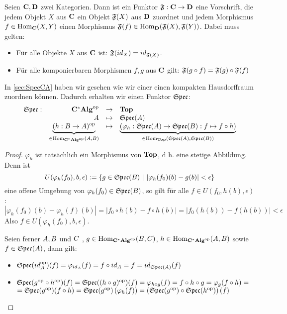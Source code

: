 \begin{defn}[Funktor]
Seien $\mathbf{C}, \mathbf{D}$ zwei Kategorien. Dann ist ein Funktor $\mathfrak{F}: \mathbf{C} \to \mathbf{D}$ eine Vorschrift, die jedem Objekt $X$ aus $\mathbf{C}$ ein Objekt $\mathfrak{F}(X)$ aus $\mathbf{D}$ zuordnet und jedem Morphismus $f \in \mathrm{Hom}_{\mathbf{C}}(X,Y)$ einen Morphismus $\mathfrak{F}(f) \in \mathrm{Hom}_{\mathbf{D}}(\mathfrak{F}(X), \mathfrak{F}(Y))$. Dabei muss gelten:
\begin{itemize}
	\item Für alle Objekte $X$ aus $\mathbf{C}$ ist: $\mathfrak{F}(id_X) = id_{\mathfrak{F}(X)}$.
	\item Für alle komponierbaren Morphismen $f, g$ aus $\mathbf{C}$ gilt: $\mathfrak{F}(g\circ f) = \mathfrak{F}(g)\circ \mathfrak{F}(f)$
\end{itemize}
\end{defn}

\begin{bsp}\label{bsp:FunktorSpec}
In \cref{sec:SpecCA} haben wir gesehen wie wir einer \CAlg{} einen kompakten Hausdorffraum zuordnen können. Dadurch erhalten wir einen Funktor $\mathfrak{Spec}$:
\[ \begin{array}{@{}rrcl@{}}
	\SpecC: 	&\KatCAlg^\op		&\to 		&\KatTop													\\
				&\A					&\mapsto 	&\SpecC(\A)													\\				
				&\underbrace{(h:\B \to \A)^\op}_{\in \Hom_{\KatCAlg^\op}(\A,\B)} 	&\mapsto	
				&\underbrace{(\varphi_h: \SpecC(\A) \to \SpecC(\B): f \mapsto f \circ h)}_{\in \Hom_{\KatTop}(\SpecC(\A),\SpecC(\B))}
\end{array} \]
\end{bsp}

\begin{proof}$\varphi_h$ ist tatsächlich ein Morphismus von $\mathbf{Top}$, d h. eine stetige Abbildung. Denn ist 
	\[U(\varphi_h(f_0), b, \epsilon) := \{g \in \mathfrak{Spec}(B) ~|~ |\varphi_h(f_0)(b)-g(b)| < \epsilon\}\]
eine offene Umgebung von $\varphi_h(f_0) \in \mathfrak{Spec}(B)$, so gilt für alle $f \in U(f_0,h(b),\epsilon)$:
	\[\left|\varphi_h(f_0)(b)-\varphi_h(f)(b)\right| = \left|f_0\circ h(b) - f\circ h(b)\right| = \left|f_0(h(b))-f(h(b))\right| < \epsilon\]
Also $f \in U(\varphi_h(f_0), b, \epsilon)$.

Seien ferner $A, B$ und $C$ \CAlgn{}, $g \in \mathrm{Hom}_{\mathbf{C^*Alg}^{\mathrm{op}}}(B,C)$, $h \in \mathrm{Hom}_{\mathbf{C^*Alg}^{\mathrm{op}}}(A,B)$ sowie $f \in \mathfrak{Spec}(A)$, dann gilt:
\begin{itemize}
	\item $\mathfrak{Spec}(id_A^{\mathrm{op}})(f) = \varphi_{id_A}(f) = f \circ id_A = f =  id_{\mathfrak{Spec}(A)}(f)$
	\item $\mathfrak{Spec}(g^{\mathrm{op}} \circ h^{\mathrm{op}})(f) = \mathfrak{Spec}((h \circ g)^{\mathrm{op}})(f) = \varphi_{h \circ g}(f) = f \circ h \circ g = \varphi_g(f \circ h) =$ \newline $ = \mathfrak{Spec}(g^{\mathrm{op}})(f \circ h) = \mathfrak{Spec}(g^{\mathrm{op}})\left(\varphi_h(f)\right) = \left(\mathfrak{Spec}(g^{\mathrm{op}})\circ\mathfrak{Spec}(h^{\mathrm{op}})\right)(f)$
\end{itemize}
\end{proof}

